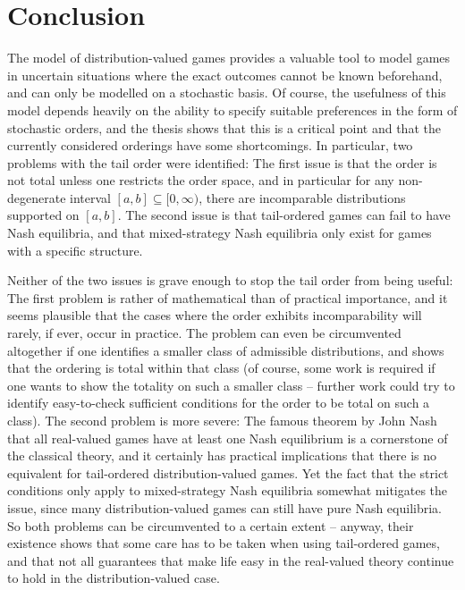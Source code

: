 \documentclass[a4paper,DIV=11,abstracton,twoside=semi]{scrreprt}
\theoremstyle{definition}
\begin{document}
    
    \chapter{Conclusion}
    The model of distribution-valued games provides a valuable tool to model games in uncertain situations where the exact outcomes cannot be known beforehand, and can only be modelled on a stochastic basis. Of course, the usefulness of this model depends heavily on the ability to specify suitable preferences in the form of stochastic orders, and the thesis shows that this is a critical point and that the currently considered orderings have some shortcomings. In particular, two problems with the tail order were identified: The first issue is that the order is not total unless one restricts the order space, and in particular for any non-degenerate interval $[a, b] \subseteq [0, \infty)$, there are incomparable distributions supported on $[a, b]$. The second issue is that tail-ordered games can fail to have Nash equilibria, and that mixed-strategy Nash equilibria only exist for games with a specific structure. 
    
    Neither of the two issues is grave enough to stop the tail order from being useful: The first problem is rather of mathematical than of practical importance, and it seems plausible that the cases where the order exhibits incomparability will rarely, if ever, occur in practice. The problem can even be circumvented altogether if one identifies a smaller class of admissible distributions, and shows that the ordering is total within that class (of course, some work is required if one wants to show the totality on such a smaller class -- further work could try to identify easy-to-check sufficient conditions for the order to be total on such a class). The second problem is more severe: The famous theorem by John Nash that all real-valued games have at least one Nash equilibrium is a cornerstone of the classical theory, and it certainly has practical implications that there is no equivalent for tail-ordered distribution-valued games. Yet  the fact that the strict conditions only apply to mixed-strategy Nash equilibria somewhat mitigates the issue, since many distribution-valued games can still have pure Nash equilibria.
    So both problems can be circumvented to a certain extent -- anyway, their existence shows that some care has to be taken when using tail-ordered games, and that not all guarantees that make life easy in the real-valued theory continue to hold in the distribution-valued case.
    
\end{document}
